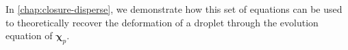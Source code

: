 \begin{enumerate}
\end{enumerate}
In \ref{chap:closure-disperse}, we demonstrate how this set of equations can be used to theoretically recover the deformation of a droplet through the evolution equation of $\bm{\chi}_p$. 